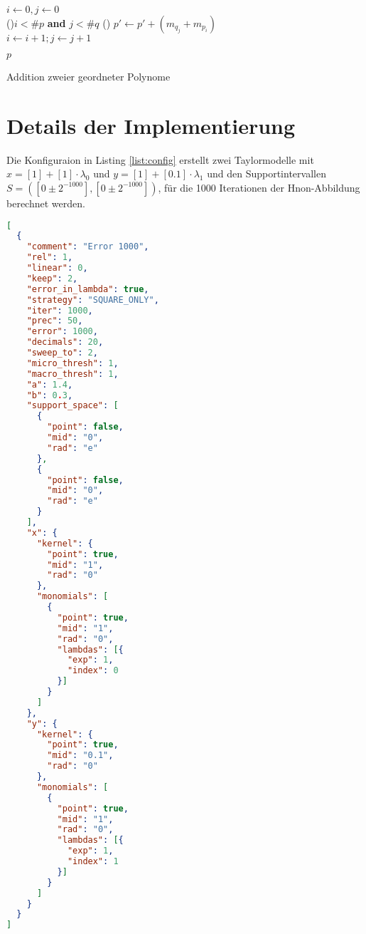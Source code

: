 \begin{algorithm}[H]
\SetAlgoLined
\label{algo:add}
$i \gets 0, j \gets 0$ \\
\While(){$i < \#p$ \textbf{and} $j  < \#q$} {
    \uElse(){
        $p' \gets p' + (m_{q_j} + m_{p_i})$\\
        $i \gets i+1; j \gets j +1 $\\
    }
}

\Return $p$

 \caption{Addition zweier geordneter Polynome}
\end{algorithm}

\section*{Details der Implementierung}
Die Konfiguraion in Listing \ref{list:config} erstellt zwei Taylormodelle mit $x = [1] + [1] \cdot \lambda_0$ und $y = [1] + [0.1] \cdot \lambda_1 $ und den Supportintervallen $S=([0\pm2^{-1000}], [0\pm2^{-1000}])$, für die 1000 Iterationen der H\e non-Abbildung berechnet werden.

\begin{lstlisting}[language=JSON, caption=Bespielkonfiguration,captionpos=b, label=list:config]
 [
  {
    "comment": "Error 1000",
    "rel": 1,
    "linear": 0,
    "keep": 2,
    "error_in_lambda": true,
    "strategy": "SQUARE_ONLY",
    "iter": 1000,
    "prec": 50,
    "error": 1000,
    "decimals": 20,
    "sweep_to": 2,
    "micro_thresh": 1,
    "macro_thresh": 1,
    "a": 1.4,
    "b": 0.3,
    "support_space": [
      {
        "point": false,
        "mid": "0",
        "rad": "e"
      },
      {
        "point": false,
        "mid": "0",
        "rad": "e"
      }
    ],
    "x": {
      "kernel": {
        "point": true,
        "mid": "1",
        "rad": "0"
      },
      "monomials": [
        {
          "point": true,
          "mid": "1",
          "rad": "0",
          "lambdas": [{
            "exp": 1,
            "index": 0
          }]
        }
      ]
    },
    "y": {
      "kernel": {
        "point": true,
        "mid": "0.1",
        "rad": "0"
      },
      "monomials": [
        {
          "point": true,
          "mid": "1",
          "rad": "0",
          "lambdas": [{
            "exp": 1,
            "index": 1
          }]
        }
      ]
    }
  }
]
\end{lstlisting}
